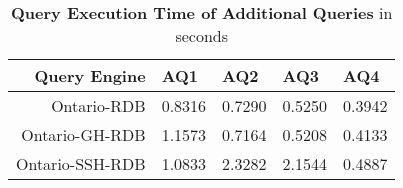 \begin{table}[!hp]
    \centering
    \begin{tabularx}{0.66\linewidth}{r Y Y Y Y}
        \hline\textbf{Query Engine} &\textbf{AQ1} &\textbf{AQ2} &\textbf{AQ3} &\textbf{AQ4}\\\hline
        Ontario-RDB     &0.8316   &0.7290   &0.5250   &0.3942\\
        Ontario-GH-RDB  &1.1573   &0.7164   &0.5208   &0.4133\\
        Ontario-SSH-RDB &1.0833   &2.3282   &2.1544   &0.4887
    \end{tabularx}
    \caption[Query Execution Time of Additional Queries]{\textbf{Query Execution Time of Additional Queries} in seconds}
    \label{tab:exec_time:aq}
\end{table}